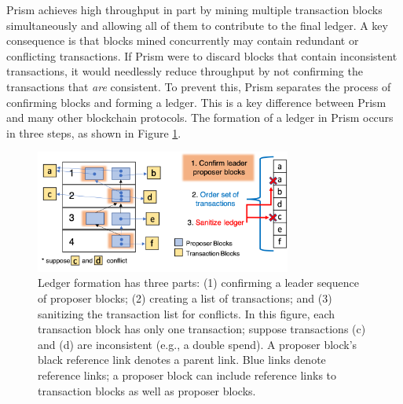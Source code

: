 Prism achieves high throughput in part by mining multiple transaction blocks simultaneously and allowing all of them to contribute to the final ledger. 
A key consequence is that blocks mined concurrently may contain redundant or conflicting transactions.
If Prism were to discard blocks that contain inconsistent transactions, it would needlessly reduce throughput by not confirming the transactions that \emph{are} consistent.
To prevent this, Prism separates the process of confirming blocks and forming a ledger. 
This is a key difference between Prism and many other blockchain protocols.
The formation of a ledger in Prism  occurs in three steps, as shown in Figure \ref{fig:leader_ledger}. 

\begin{figure}
   \centering
   \includegraphics[width=0.75\textwidth]{figures/ledger_generation.png}
    \caption[Ledger formation of Prism.]{Ledger formation has three parts:  
   (1)  confirming a leader  sequence of proposer blocks;
   (2)  creating a list  of transactions;
   and (3) sanitizing the transaction list for conflicts. 
   In this figure, each transaction  block has only one transaction; suppose transactions  (c) and (d) are inconsistent (e.g., a double spend).
   A proposer block's black reference link denotes a parent link. 
    Blue links denote reference links; a proposer block can include reference links to transaction blocks as well as proposer blocks.}
   \label{fig:leader_ledger}

 \end{figure}

